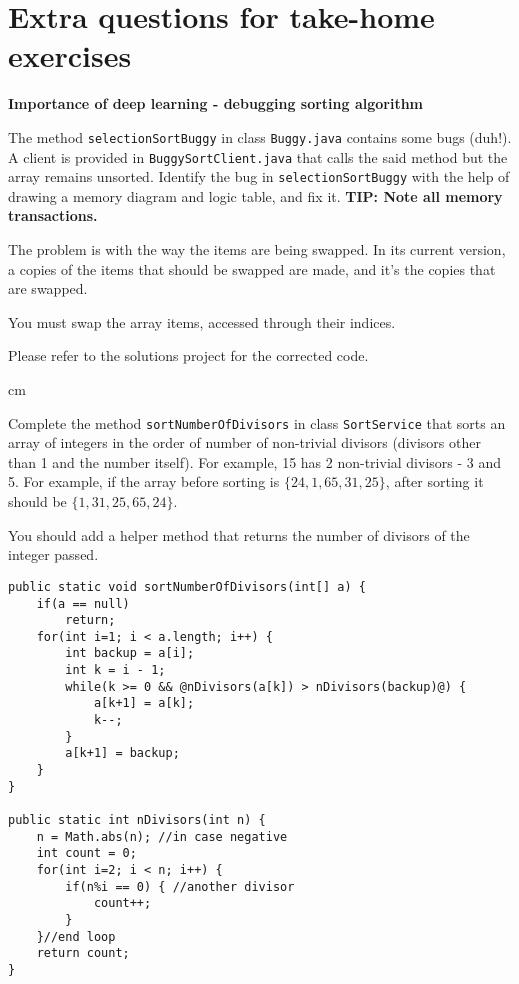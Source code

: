 \newpage

\section*{Extra questions for take-home exercises}

\begin{questions}
\question  \textbf{Importance of deep learning - debugging sorting algorithm} \vskip 0.5cm

The method \texttt{selectionSortBuggy} in class \texttt{Buggy.java} contains some bugs (duh!).
A client is provided in \texttt{BuggySortClient.java} that calls the said method but the array remains unsorted. Identify the bug in \texttt{selectionSortBuggy} with the help of drawing a memory diagram and logic table, and fix it. \textbf{TIP: Note all memory transactions.}

\begin{solution}
The problem is with the way the items are being swapped. In its current version, a copies of the items that should be swapped are made, and it's the copies that are swapped.
	
You must swap the array items, accessed through their indices.	

Please refer to the solutions project for the corrected code.
\end{solution}	

 cm 

\question  Complete the method \texttt{sortNumberOfDivisors} in class \texttt{SortService} that sorts an array of integers in the order of number of non-trivial divisors (divisors other than 1 and the number itself). For example, 15 has 2 non-trivial divisors - 3 and 5. For example, if the array before sorting is $\{24, 1, 65, 31, 25\}$, after sorting it should be $\{1, 31, 25, 65, 24\}$. 

You should add a helper method that returns the number of divisors of the integer passed. 

\begin{solution}
\begin{lstlisting}[style=buggy]
public static void sortNumberOfDivisors(int[] a) {
	if(a == null) 
		return;
	for(int i=1; i < a.length; i++) {
		int backup = a[i];
		int k = i - 1;
		while(k >= 0 && @nDivisors(a[k]) > nDivisors(backup)@) {
			a[k+1] = a[k];
			k--;
		}
		a[k+1] = backup;
	}
}

public static int nDivisors(int n) {
	n = Math.abs(n); //in case negative
	int count = 0;
	for(int i=2; i < n; i++) {
		if(n%i == 0) { //another divisor
			count++;
		}
	}//end loop
	return count;
}	
\end{lstlisting}
\end{solution}


\end{questions}
